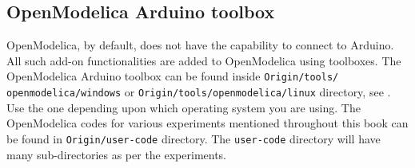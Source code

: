 \subsection{OpenModelica Arduino toolbox}\label{load-om-toolbox}
OpenModelica, by default, does not have the capability to connect to Arduino. 
All such add-on functionalities are added to OpenModelica using toolboxes.  
The OpenModelica Arduino toolbox can be found inside {\tt Origin/tools/\\openmodelica/windows} or {\tt Origin/tools/openmodelica/linux} directory,
see .  Use the one depending upon
which operating system you are using. The OpenModelica codes for various
experiments mentioned throughout this book can be found in {\tt Origin/user-code} directory. The {\tt user-code} directory will have
many sub-directories as per the experiments. 

